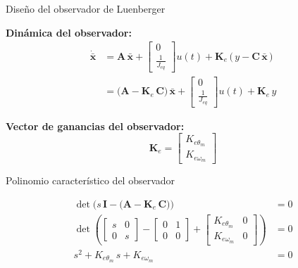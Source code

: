 \documentclass[aspectratio=169,t]{beamer}
\begin{document}
\begin{frame}{Diseño del observador de Luenberger}
\vspace{3mm}

\textbf{Dinámica del observador:}
\begin{align*}
\dot{\bar{\bm{x}}} &= \bm{A}\,\bar{\bm{x}} + \begin{bmatrix} 0 \\ \tfrac{1}{J_{eq}} \end{bmatrix} u(t) + \bm{K}_e\,\big(\,y - \bm{C}\,\bar{\bm{x}}\,\big) \\[4pt]
&= \big(\bm{A} - \bm{K}_e\,\bm{C}\big)\,\bar{\bm{x}} + \begin{bmatrix} 0 \\ \tfrac{1}{J_{eq}} \end{bmatrix} u(t) + \bm{K}_e\,y
\end{align*}

\textbf{Vector de ganancias del observador:}
\begin{equation*}
\bm{K}_e = \begin{bmatrix} K_{e\theta_m} \\ K_{e\omega_m} \end{bmatrix}
\end{equation*}
\end{frame}

\begin{frame}{Polinomio característico del observador}
\vspace{4mm}

\begin{align*}
\det\!\Big(s\,\bm{I} - \big(\bm{A} - \bm{K}_e\,\bm{C}\big)\Big) &= 0 \\[6pt]
\det\!\left(
\begin{bmatrix} s & 0 \\ 0 & s \end{bmatrix}
- \begin{bmatrix} 0 & 1 \\ 0 & 0 \end{bmatrix}
+ \begin{bmatrix} K_{e\theta_m} & 0 \\ K_{e\omega_m} & 0 \end{bmatrix}
\right) &= 0 \\[6pt]
s^{2} + K_{e\theta_m}\,s + K_{e\omega_m} &= 0
\end{align*}
\end{frame}
\end{document}
